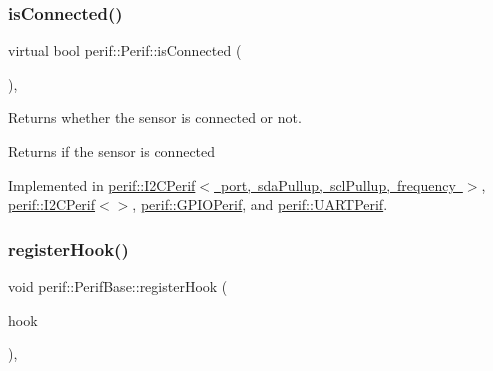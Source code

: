 \begin{DoxyCode}{0}

\end{DoxyCode}
\mbox{\label{classperif_1_1Perif_ab9a17fad04e595f3ac0c78b9d3be4c9e}} 
\subsubsection{\texorpdfstring{isConnected()}{isConnected()}}
{\footnotesize\ttfamily virtual bool perif\+::\+Perif\+::is\+Connected (\begin{DoxyParamCaption}{ }\end{DoxyParamCaption})\hspace{0.3cm}{\ttfamily [pure virtual]}, {\ttfamily [inherited]}}

Returns whether the sensor is connected or not.

\begin{DoxyReturn}{Returns}
if the sensor is connected 
\end{DoxyReturn}


Implemented in \mbox{\hyperlink{classperif_1_1I2CPerif_aa8741297b2f5f9a0242806afa26b7361}{perif\+::\+I2\+C\+Perif$<$ port, sda\+Pullup, scl\+Pullup, frequency $>$}}, \mbox{\hyperlink{classperif_1_1I2CPerif_aa8741297b2f5f9a0242806afa26b7361}{perif\+::\+I2\+C\+Perif$<$$>$}}, \mbox{\hyperlink{classperif_1_1GPIOPerif_ae7c93b409fd4d4d49f9f8eddae612b3e}{perif\+::\+G\+P\+I\+O\+Perif}}, and \mbox{\hyperlink{classperif_1_1UARTPerif_a14c1fdcd81cd9a5eac9d4c0ac9863b66}{perif\+::\+U\+A\+R\+T\+Perif}}.

\mbox{\label{classperif_1_1PerifBase_a2e8bcc221ee253b21b61c7c07307d931}} 
\subsubsection{\texorpdfstring{registerHook()}{registerHook()}}
{\footnotesize\ttfamily void perif\+::\+Perif\+Base\+::register\+Hook (\begin{DoxyParamCaption}\item[{function$<$ void(\mbox{\hyperlink{Perif_8hpp_a358ff4ee6d24694ee7661f0cce14377e}{Dev\+Map}} \&)$>$ \&\&}]{hook }\end{DoxyParamCaption})\hspace{0.3cm}{\ttfamily [inline]}, {\ttfamily [inherited]}}

